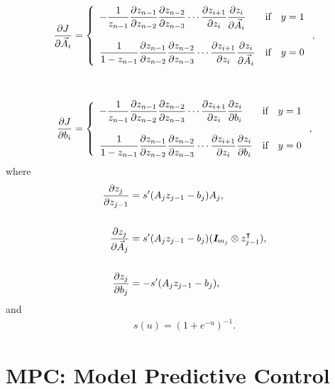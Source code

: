 \documentclass{article}
\begin{document}
    \begin{align*}
        \frac{\partial  J }{\partial \vec{A}_i}&=\left\{
            \begin{array}{lllllllllllllllllll}
                -\dfrac{1}{z_{n-1}} \dfrac{\partial z_{n-1}}{\partial z_{n-2}}\dfrac{\partial z_{n-2}}{\partial z_{n-3}}\cdots
        \dfrac{\partial z_{i+1}}{\partial z_i}\dfrac{\partial z_i}{\partial \vec{A}_i}
        & \text{if}\quad y=1\\\\
        \dfrac{1}{1-z_{n-1}} \dfrac{\partial z_{n-1}}{\partial z_{n-2}}\dfrac{\partial z_{n-2}}{\partial z_{n-3}}\cdots
        \dfrac{\partial z_{i+1}}{\partial z_i}\dfrac{\partial z_i}{\partial \vec{A}_i}
        & \text{if}\quad y=0
        \end{array}\right.,\\\\\\
        \frac{\partial  J }{\partial b_i}&=\left\{
            \begin{array}{lllllllllllllllllll}
                -\dfrac{1}{z_{n-1}} \dfrac{\partial z_{n-1}}{\partial z_{n-2}}\dfrac{\partial z_{n-2}}{\partial z_{n-3}}\cdots
                \dfrac{\partial z_{i+1}}{\partial z_i}\dfrac{\partial z_i}{\partial b_i}
        & \text{if}\quad y=1\\\\
        \dfrac{1}{1-z_{n-1}} \dfrac{\partial z_{n-1}}{\partial z_{n-2}}\dfrac{\partial z_{n-2}}{\partial z_{n-3}}\cdots
        \dfrac{\partial z_{i+1}}{\partial z_i}\dfrac{\partial z_i}{\partial b_i}
        & \text{if}\quad y=0
        \end{array}\right.,
    \end{align*}
    where
    \begin{align*}
        \frac{\partial z_j}{\partial z_{j-1}}&=s'(A_jz_{j-1} -b_j)A_j,\\\\
        \frac{\partial z_j}{\partial \vec{A}_j}&=s'(A_jz_{j-1} -b_j)(\emph{\textbf{I}}_{m_j}\otimes z_{j-1} ^\intercal),\\\\
        \frac{\partial z_j}{\partial b_j}&=-s'(A_jz_{j-1} -b_j),
    \end{align*}
    and
    \begin{align*}
        s(u)=(1+e^{-u})^{-1}.
    \end{align*}

\clearpage

\section{MPC: Model Predictive Control}
\end{document}
